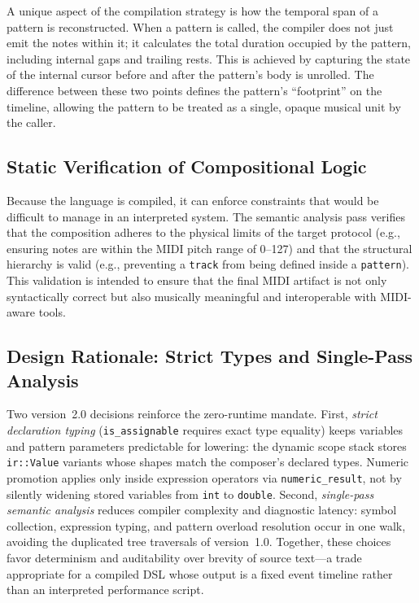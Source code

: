 A unique aspect of the compilation strategy is how the temporal span of a pattern is reconstructed.
When a pattern is called, the compiler does not just emit the notes within it; it calculates the total duration occupied
by the pattern, including internal gaps and trailing rests.
This is achieved by capturing the state of the internal cursor before and after the pattern's body is unrolled.
The difference between these two points defines the pattern's ``footprint'' on the timeline, allowing the pattern to be
treated as a single, opaque musical unit by the caller.

\subsection{Static Verification of Compositional Logic}\label{detail-subsec:static-verification-of-compositional-logic}

Because the language is compiled, it can enforce constraints that would be difficult to manage in an interpreted system.
The semantic analysis pass verifies that the composition adheres to the physical limits of the target protocol (e.g.,
ensuring notes are within the MIDI pitch range of 0--127) and that the structural hierarchy is valid (e.g., preventing a
\texttt{track} from being defined inside a \texttt{pattern}).
This validation is intended to ensure that the final MIDI artifact is not only syntactically correct but also musically
meaningful and interoperable with MIDI-aware tools.

\subsection{Design Rationale: Strict Types and Single-Pass Analysis}\label{detail-subsec:strict-types-rationale}

Two version~2.0 decisions reinforce the zero-runtime mandate.
First, \textit{strict declaration typing} (\texttt{is\_assignable} requires exact type equality) keeps variables and
pattern parameters predictable for lowering: the dynamic scope stack stores \texttt{ir::Value} variants whose shapes
match the composer's declared types.
Numeric promotion applies only inside expression operators via \texttt{numeric\_result}, not by silently widening
stored variables from \texttt{int} to \texttt{double}.
Second, \textit{single-pass semantic analysis} reduces compiler complexity and diagnostic latency: symbol collection,
expression typing, and pattern overload resolution occur in one walk, avoiding the duplicated tree traversals of
version~1.0.
Together, these choices favor determinism and auditability over brevity of source text---a trade appropriate for a
compiled DSL whose output is a fixed event timeline rather than an interpreted performance script.

